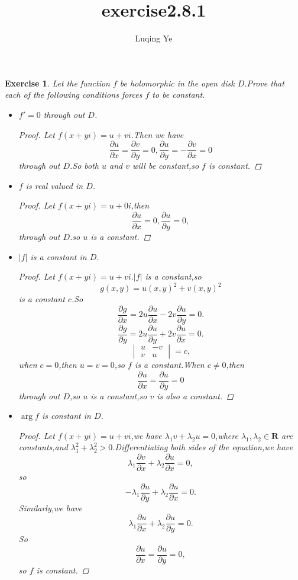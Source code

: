 \documentclass{amsart}
\newcommand\pa{{\mathbb{\partial}}}
\theoremstyle{plain}
\newtheorem{exercise}[theorem]{Exercise}
\theoremstyle{definition}
\begin{document}
\title{exercise2.8.1}

\author{Luqing Ye}
\address{College of Science, Hangzhou Normal University,Hangzhou City,Zhejiang Province,China}

\maketitle
\begin{exercise}
  Let the function $f$ be holomorphic in the open disk $D$.Prove that
  each of the following conditions forces $f$ to be constant.
  \begin{itemize}
  \item $f'=0$ through out $D$.
    \begin{proof}
      Let $f(x+yi)=u+vi$.Then we have
$$
\frac{\pa u}{\pa x}=\frac{\pa v}{\pa y}=0,\frac{\pa u}{\pa
  y}=-\frac{\pa v}{\pa x}=0
$$
through out $D$.So both $u$ and $v$ will be constant,so $f$ is constant.
    \end{proof}
\item $f$ is real valued in $D$.
  \begin{proof}
    Let $f(x+yi)=u+0i$,then 
$$
\frac{\pa u}{\pa x}=0,\frac{\pa u}{\pa y}=0,
$$
through out $D$.so $u$ is a constant.
  \end{proof}
\item $|f|$ is a constant in $D$.
  \begin{proof}
Let $f(x+yi)=u+vi$.$|f|$ is a constant,so
$$
g(x,y)=u(x,y)^2+v(x,y)^2
$$
is a constant $c$.So
$$
\frac{\pa g}{\pa x}=2u\frac{\pa u}{\pa x}-2v\frac{\pa u}{\pa y}=0.
$$
$$
\frac{\pa g}{\pa y}=2u \frac{\pa u}{\pa y}+2v \frac{\pa u}{\pa x}=0.
$$
$$
\begin{vmatrix}
  u&-v\\
v&u
\end{vmatrix}=c,
$$
when $c=0$,then $u=v=0$,so $f$ is a constant.When $c\neq 0$,then 
$$
\frac{\pa u}{\pa x}=\frac{\pa u}{\pa y}=0
$$
through out $D$,so $u$ is a constant,so $v$ is also a constant.
  \end{proof}
\item $\arg f$ is constant in $D$.
  \begin{proof}
  Let $f(x+yi)=u+vi$,we have $\lambda_1v+\lambda_2u=0$,where
  $\lambda_1,\lambda_2\in \mathbf{R}$ are constants,and $\lambda_1^2+\lambda_2^2>0$.Differentiating
  both sides of the equation,we have
$$
\lambda_1 \frac{\pa v}{\pa x}+\lambda_2 \frac{\pa u}{\pa x}=0,
$$
so
$$
-\lambda_1 \frac{\pa u}{\pa y}+\lambda_2 \frac{\pa u}{\pa x}=0.
$$
Similarly,we have
$$
\lambda_1 \frac{\pa u}{\pa x}+\lambda_2 \frac{\pa u}{\pa y}=0.
$$
So 
$$
\frac{\pa u}{\pa x}=\frac{\pa u}{\pa y}=0,
$$
so $f$ is constant.
  \end{proof}
  \end{itemize}
\end{exercise}
\setcounter{tocdepth}{2}
\end{document}
